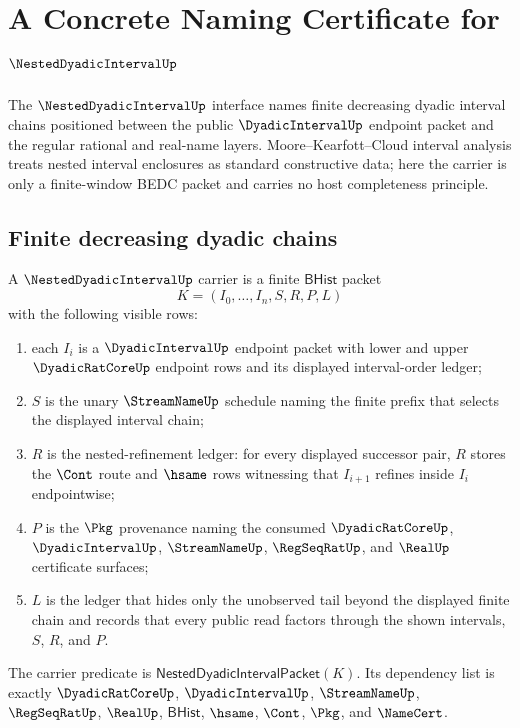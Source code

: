 \chapter{A Concrete Naming Certificate for $\NestedDyadicIntervalUp$}
\label{ch:concrete-instances-nesteddyadicinterval-namecert}

The $\NestedDyadicIntervalUp$ interface names finite decreasing dyadic interval chains positioned between the public $\DyadicIntervalUp$ endpoint packet and the regular rational and real-name layers. Moore--Kearfott--Cloud interval analysis treats nested interval enclosures as standard constructive data; here the carrier is only a finite-window BEDC packet and carries no host completeness principle.

\section{Finite decreasing dyadic chains}
\label{sec:nesteddyadicinterval-finite-decreasing-dyadic-chains}

\begin{definition}
\label{def:nesteddyadicinterval-carrier}
A $\NestedDyadicIntervalUp$ carrier is a finite $\mathsf{BHist}$ packet
$$
K=(I_0,\ldots,I_n,S,R,P,L)
$$
with the following visible rows:
\begin{enumerate}
\item each $I_i$ is a $\DyadicIntervalUp$ endpoint packet with lower and upper $\DyadicRatCoreUp$ endpoint rows and its displayed interval-order ledger;
\item $S$ is the unary $\StreamNameUp$ schedule naming the finite prefix that selects the displayed interval chain;
\item $R$ is the nested-refinement ledger: for every displayed successor pair, $R$ stores the $\Cont$ route and $\hsame$ rows witnessing that $I_{i+1}$ refines inside $I_i$ endpointwise;
\item $P$ is the $\Pkg$ provenance naming the consumed $\DyadicRatCoreUp$, $\DyadicIntervalUp$, $\StreamNameUp$, $\RegSeqRatUp$, and $\RealUp$ certificate surfaces;
\item $L$ is the ledger that hides only the unobserved tail beyond the displayed finite chain and records that every public read factors through the shown intervals, $S$, $R$, and $P$.
\end{enumerate}
The carrier predicate is $\mathsf{NestedDyadicIntervalPacket}(K)$. Its dependency list is exactly $\DyadicRatCoreUp$, $\DyadicIntervalUp$, $\StreamNameUp$, $\RegSeqRatUp$, $\RealUp$, $\mathsf{BHist}$, $\hsame$, $\Cont$, $\Pkg$, and $\NameCert$.
\end{definition}

